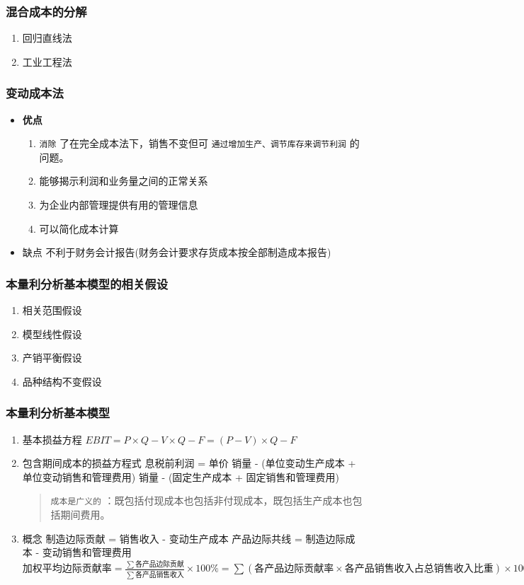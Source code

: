 \documentclass[11pt]{article}
\begin{document}
\subsubsection{混合成本的分解}
\label{sec:org704d41a}
\begin{enumerate}
\item 回归直线法
\item 工业工程法
\end{enumerate}
\subsubsection{变动成本法}
\label{sec:orgcc497d3}
\begin{itemize}
\item \textbf{优点}
\begin{enumerate}
\item \texttt{消除} 了在完全成本法下，销售不变但可 \texttt{通过增加生产、调节库存来调节利润} 的问题。
\item 能够揭示利润和业务量之间的正常关系
\item 为企业内部管理提供有用的管理信息
\item 可以简化成本计算
\end{enumerate}
\item 缺点
不利于财务会计报告(财务会计要求存货成本按全部制造成本报告)
\end{itemize}
\subsubsection{本量利分析基本模型的相关假设}
\label{sec:org20dac2a}
\begin{enumerate}
\item 相关范围假设
\item 模型线性假设
\item 产销平衡假设
\item 品种结构不变假设
\end{enumerate}
\subsubsection{本量利分析基本模型}
\label{sec:org1df3581}
\begin{enumerate}
\item 基本损益方程
\label{sec:orgd881069}
\(EBIT=P \times Q - V \times Q - F =(P - V) \times Q -F\)
\item 包含期间成本的损益方程式
\label{sec:orged27703}
息税前利润 = 单价 \texttimes{} 销量 - (单位变动生产成本 + 单位变动销售和管理费用) \texttimes{} 销量 - (固定生产成本 + 固定销售和管理费用)
\begin{quote}
\texttt{成本是广义的} ：既包括付现成本也包括非付现成本，既包括生产成本也包括期间费用。
\end{quote}
\item 概念
\label{sec:orgef2b9e9}
制造边际贡献 = 销售收入 - 变动生产成本
产品边际共线 = 制造边际成本 - 变动销售和管理费用
\(加权平均边际贡献率 = \frac{\sum 各产品边际贡献}{\sum 各产品销售收入} \times 100\% =\sum(各产品边际贡献率 \times 各产品销售收入占总销售收入比重)\times 100\%\)
\end{enumerate}
\end{document}
